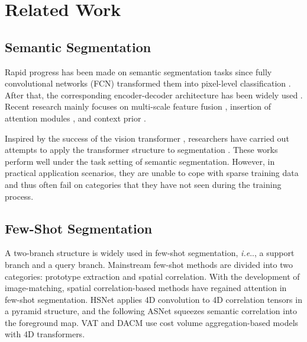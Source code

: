 \documentclass[letterpaper]{article} %
\makeatletter
\DeclareRobustCommand\onedot{\futurelet\@let@token\@onedot}
\def\@onedot{\ifx\@let@token.\else.\null\fi\xspace}
\def\ie{\emph{i.e}\onedot} \def\Ie{\emph{I.e}\onedot}
\makeatother
\begin{document}
\section{Related Work}
\subsection{Semantic Segmentation}
Rapid progress has been made on semantic segmentation tasks since fully convolutional networks (FCN) transformed them into pixel-level classification \cite{long2015fully}. After that, the corresponding encoder-decoder architecture has been widely used \cite{qin2022activation,qin2022multi,qin2023freeseg}. Recent research mainly focuses on multi-scale feature fusion \cite{zhao2017pyramid,chen2018encoder,yang2018denseaspp,he2019adaptive}, insertion of attention modules \cite{fu2019dual,yuan2018ocnet,li2019expectation,tao2020hierarchical,zhu2019asymmetric,zhang2019acfnet}, and context prior \cite{lin2017refinenet,zhang2018context,yu2020context,jin2021mining}.

Inspired by the success of the vision transformer \cite{dosovitskiy2020image}, researchers have carried out attempts to apply the transformer structure to segmentation \cite{yuan2021hrformer,wang2021pyramid,lee2022mpvit,xie2021segformer,strudel2021segmenter}. These works perform well under the task setting of semantic segmentation. However, in practical application scenarios, they are unable to cope with sparse training data and thus often fail on categories that they have not seen during the training process.

\subsection{Few-Shot Segmentation}
A two-branch structure is widely used in few-shot segmentation, \ie, a support branch and a query branch. Mainstream few-shot methods are divided into two categories: prototype extraction and spatial correlation. With the development of image-matching, spatial correlation-based methods have regained attention in few-shot segmentation. HSNet \cite{min2021hypercorrelation} applies 4D convolution to 4D correlation tensors in a pyramid structure, and the following ASNet \cite{kang2022integrative} squeezes semantic correlation into the foreground map. VAT \cite{hong2022cost} and DACM \cite{xiong2022doubly} use cost volume aggregation-based models with 4D transformers.
\end{document}
